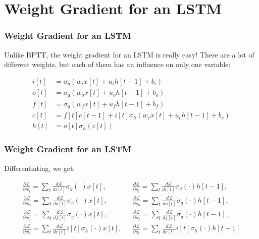 \documentclass{beamer}
\begin{document}
\section[Weight Gradient]{Weight Gradient for an LSTM}
\setcounter{subsection}{1}

\begin{frame}
  \frametitle{Weight Gradient for an LSTM}

  Unlike BPTT, the weight gradient for an LSTM is really easy!  There
  are a lot of different weights, but each of them has an influence on
  only one variable:
  
  \begin{align*}
    i[t] &=\sigma_g(w_i x[t]+u_i h[t-1]+b_i)\\
    o[t] &=\sigma_g(w_o x[t]+u_o h[t-1]+b_o)\\
    f[t] &=\sigma_g(w_f x[t]+u_f h[t-1]+b_f)\\
    c[t] &=f[t]c[t-1]+i[t]\sigma_h\left(w_cx[t]+u_ch[t-1]+b_c\right)\\
    h[t] &=o[t]\sigma_h(c[t])
  \end{align*}
\end{frame}

\begin{frame}
  \frametitle{Weight Gradient for an LSTM}

  Differentiating, we get:
  
  \begin{align*}
    \frac{\partial\mathcal{L}}{\partial w_i}=\sum_t\frac{d\mathcal{L}}{di[t]}\dot\sigma_g(\cdot)x[t],
    &~~~
    \frac{\partial\mathcal{L}}{\partial u_i}=\sum_t\frac{d\mathcal{L}}{di[t]}\dot\sigma_g(\cdot)h[t-1],\\
    \frac{\partial\mathcal{L}}{\partial w_o}=\sum_t\frac{d\mathcal{L}}{do[t]}\dot\sigma_g(\cdot)x[t],
    &~~~
    \frac{\partial\mathcal{L}}{\partial u_o}=\sum_t\frac{d\mathcal{L}}{do[t]}\dot\sigma_g(\cdot)h[t-1],\\
    \frac{\partial\mathcal{L}}{\partial w_f}=\sum_t\frac{d\mathcal{L}}{df[t]}\dot\sigma_g(\cdot)x[t],
    &~~~
    \frac{\partial\mathcal{L}}{\partial u_f}=\sum_t\frac{d\mathcal{L}}{df[t]}\dot\sigma_g(\cdot)h[t-1],\\
    \frac{\partial\mathcal{L}}{\partial w_c}=\sum_t\frac{d\mathcal{L}}{dc[t]}i[t]\dot\sigma_h(\cdot)x[t],
    &~~~
    \frac{\partial\mathcal{L}}{\partial u_c}=\sum_t\frac{d\mathcal{L}}{dc[t]}i[t]\dot\sigma_h(\cdot)h[t-1]
  \end{align*}
\end{frame}
\end{document}
